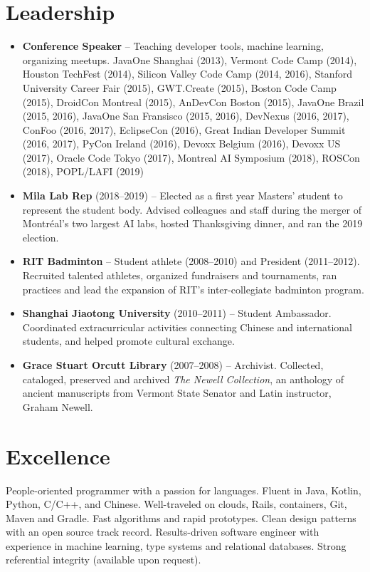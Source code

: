 \documentclass[letterpaper,11pt]{article}
\newcommand{\resumeItem}[2]{
\item\small{
\textbf{#1}{ #2 \vspace{-2pt}}
}
}
\newcommand{\resumeSubItem}[2]{\resumeItem{#1}{#2}\vspace{-4pt}}
\newcommand{\resumeSubHeadingListStart}{\begin{itemize}[leftmargin=*]}
\newcommand{\resumeSubHeadingListEnd}{\end{itemize}}
\begin{document}
\section{Leadership}
\resumeSubHeadingListStart
\resumeSubItem{Conference Speaker} {-- Teaching developer tools, machine learning, organizing meetups. JavaOne Shanghai (2013), Vermont Code Camp (2014), Houston TechFest (2014), Silicon Valley Code Camp (2014, 2016), Stanford University Career Fair (2015), GWT.Create (2015), Boston Code Camp (2015), DroidCon Montreal (2015), AnDevCon Boston (2015), JavaOne Brazil (2015, 2016), JavaOne San Fransisco (2015, 2016), DevNexus (2016, 2017), ConFoo (2016, 2017), EclipseCon (2016), Great Indian Developer Summit (2016, 2017), PyCon Ireland (2016), Devoxx Belgium (2016), Devoxx US (2017), Oracle Code Tokyo (2017), Montreal AI Symposium (2018), ROSCon (2018), POPL/LAFI (2019)}
\resumeSubItem{Mila Lab Rep} {(2018--2019) -- Elected as a first year Masters' student to represent the student body. Advised colleagues and staff during the merger of Montr\'eal's two largest AI labs, hosted Thanksgiving dinner, and ran the 2019 election.}
\resumeSubItem{RIT Badminton} {-- Student athlete (2008--2010) and President (2011--2012). Recruited talented athletes, organized fundraisers and tournaments, ran practices and lead the expansion of RIT's inter-collegiate badminton program.}
\resumeSubItem{Shanghai Jiaotong University} {(2010--2011) -- Student Ambassador. Coordinated extracurricular activities connecting Chinese and international students, and helped promote cultural exchange.}
\resumeSubItem{Grace Stuart Orcutt Library} {(2007--2008) -- Archivist. Collected, cataloged, preserved and archived \textit{The Newell Collection}, an anthology of ancient manuscripts from Vermont State Senator and Latin instructor, Graham Newell.}
\resumeSubHeadingListEnd

\section{Excellence}
People-oriented programmer with a passion for languages. Fluent in Java, Kotlin, Python, C/C++,
and Chinese. Well-traveled on clouds, Rails, containers, Git, Maven and Gradle. Fast algorithms and
rapid prototypes. Clean design patterns with an open source track record. Results-driven software
engineer with experience in machine learning, type systems and relational databases.
Strong referential integrity (available upon request).
\end{document}

